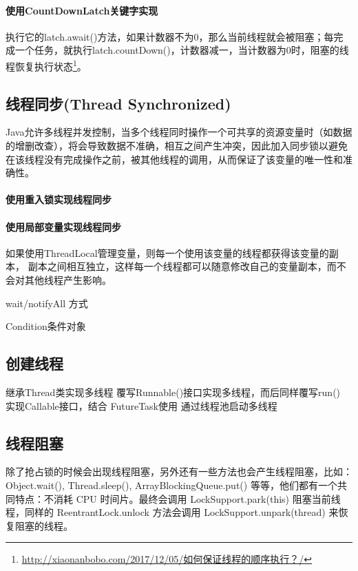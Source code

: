 \documentclass[../../../interview-questions.tex]{subfiles}
\begin{document}
\paragraph{使用CountDownLatch关键字实现}执行它的latch.await()方法，如果计数器不为0，那么当前线程就会被阻塞；每完成一个任务，就执行latch.countDown()，计数器减一，当计数器为0时，阻塞的线程恢复执行状态\footnote{\url{http://xiaonanbobo.com/2017/12/05/如何保证线程的顺序执行？/}}。


\subsection{线程同步(Thread Synchronized)}

Java允许多线程并发控制，当多个线程同时操作一个可共享的资源变量时（如数据的增删改查），将会导致数据不准确，相互之间产生冲突，因此加入同步锁以避免在该线程没有完成操作之前，被其他线程的调用，从而保证了该变量的唯一性和准确性。

\paragraph{使用重入锁实现线程同步}

\paragraph{使用局部变量实现线程同步}

如果使用ThreadLocal管理变量，则每一个使用该变量的线程都获得该变量的副本，
副本之间相互独立，这样每一个线程都可以随意修改自己的变量副本，而不会对其他线程产生影响。

wait/notifyAll 方式

Condition条件对象

\subsection{创建线程}

继承Thread类实现多线程
覆写Runnable()接口实现多线程，而后同样覆写run()
实现Callable接口，结合 FutureTask使用
通过线程池启动多线程

\subsection{线程阻塞}

除了抢占锁的时候会出现线程阻塞，另外还有一些方法也会产生线程阻塞，比如： Object.wait(), Thread.sleep(), ArrayBlockingQueue.put() 等等，他们都有一个共同特点：不消耗 CPU 时间片。最终会调用 LockSupport.park(this) 阻塞当前线程，同样的 ReentrantLock.unlock 方法会调用 LockSupport.unpark(thread) 来恢复阻塞的线程。
\end{document}
